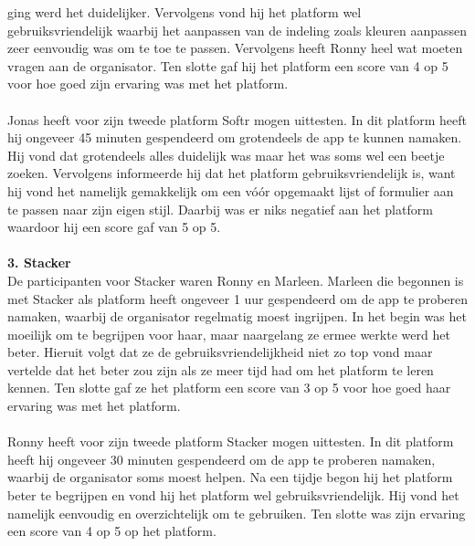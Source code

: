 ging werd het duidelijker. Vervolgens vond hij het platform wel gebruiksvriendelijk waarbij het aanpassen van de indeling zoals kleuren aanpassen zeer eenvoudig was om te toe te passen. Vervolgens heeft Ronny
heel wat moeten vragen aan de organisator.
Ten slotte gaf hij het platform een score van 4 op 5 voor hoe goed zijn ervaring was met het platform.
\\
\\
Jonas heeft voor zijn tweede platform Softr mogen uittesten. In dit platform heeft hij ongeveer 45 minuten gespendeerd om grotendeels de app te kunnen namaken.
Hij vond dat grotendeels alles duidelijk was maar het was soms wel een beetje zoeken. Vervolgens informeerde hij dat het platform gebruiksvriendelijk is, want hij vond het namelijk gemakkelijk om
een vóór opgemaakt lijst of formulier aan te passen naar zijn eigen stijl. Daarbij was er niks negatief aan het platform waardoor hij een score gaf van 5 op 5.
\\
\\
\textbf{3. Stacker}
\\
De participanten voor Stacker waren Ronny en Marleen. Marleen die begonnen is met Stacker als platform heeft ongeveer 1 uur  gespendeerd om de app te proberen namaken, waarbij de organisator regelmatig moest ingrijpen.
In het begin was het moeilijk om te begrijpen voor haar, maar naargelang ze ermee werkte werd het beter. Hieruit volgt dat ze de gebruiksvriendelijkheid niet zo top vond maar vertelde dat het beter zou zijn als ze meer tijd had om het platform te leren kennen.
Ten slotte gaf ze het platform een score van 3 op 5 voor hoe goed haar ervaring was met het platform.
\\
\\
Ronny heeft voor zijn tweede platform Stacker mogen uittesten. In dit platform heeft hij ongeveer 30 minuten gespendeerd om de app te proberen namaken, waarbij de organisator soms moest helpen.
Na een tijdje begon hij het platform beter te begrijpen en vond hij het platform wel gebruiksvriendelijk. Hij vond het namelijk eenvoudig en overzichtelijk om te gebruiken. Ten slotte was zijn ervaring een 
score van 4 op 5 op het platform.

